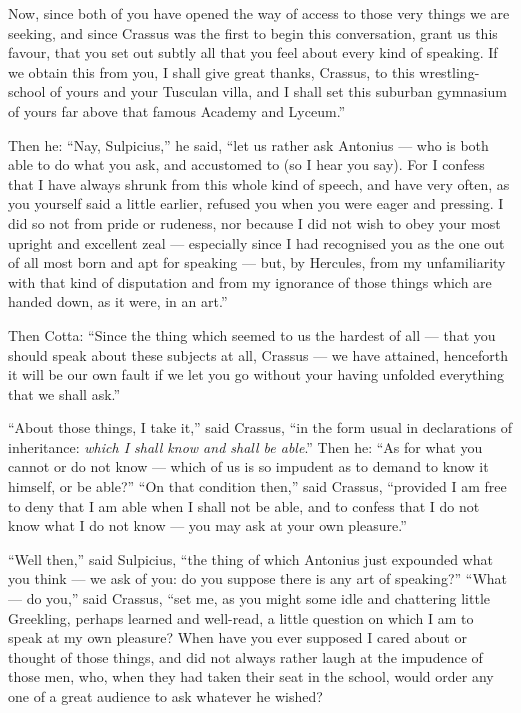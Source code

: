  Now, since both of you have opened the way of access to those very things we are seeking, and since Crassus was the first to begin this conversation, grant us this favour, that you set out subtly all that you feel about every kind of speaking. If we obtain this from you, I shall give great thanks, Crassus, to this wrestling-school of yours and your Tusculan villa, and I shall set this suburban gymnasium of yours far above that famous Academy and Lyceum.''

 Then he: ``Nay, Sulpicius,'' he said, ``let us rather ask Antonius — who is both able to do what you ask, and accustomed to (so I hear you say). For I confess that I have always shrunk from this whole kind of speech, and have very often, as you yourself said a little earlier, refused you when you were eager and pressing. I did so not from pride or rudeness, nor because I did not wish to obey your most upright and excellent zeal — especially since I had recognised you as the one out of all most born and apt for speaking — but, by Hercules, from my unfamiliarity with that kind of disputation and from my ignorance of those things which are handed down, as it were, in an art.''

 Then Cotta: ``Since the thing which seemed to us the hardest of all — that you should speak about these subjects at all, Crassus — we have attained, henceforth it will be our own fault if we let you go without your having unfolded everything that we shall ask.''

 ``About those things, I take it,'' said Crassus, ``in the form usual in declarations of inheritance: \textit{which I shall know and shall be able}.'' Then he: ``As for what you cannot or do not know — which of us is so impudent as to demand to know it himself, or be able?'' ``On that condition then,'' said Crassus, ``provided I am free to deny that I am able when I shall not be able, and to confess that I do not know what I do not know — you may ask at your own pleasure.''

 ``Well then,'' said Sulpicius, ``the thing of which Antonius just expounded what you think — we ask of you: do you suppose there is any art of speaking?'' ``What — do you,'' said Crassus, ``set me, as you might some idle and chattering little Greekling, perhaps learned and well-read, a little question on which I am to speak at my own pleasure? When have you ever supposed I cared about or thought of those things, and did not always rather laugh at the impudence of those men, who, when they had taken their seat in the school, would order any one of a great audience to ask whatever he wished?

